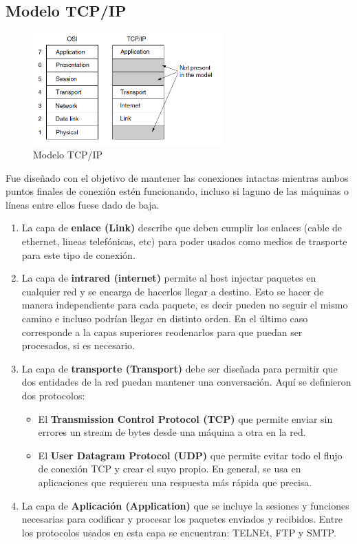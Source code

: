 \documentclass[10pt,a4paper]{article}
\begin{document}
\subsection{Modelo TCP/IP}
\begin{figure}[H]
	\centering
	\includegraphics[width=0.65\textwidth
]{images/tcpip.png}
	\caption[Modelo TCP/IP de Referencia]{Modelo TCP/IP}
	\label{fig:tcp}
\end{figure}
Fue diseñado con el objetivo de mantener las conexiones intactas mientras ambos puntos finales de conexión estén funcionando, incluso si laguno de las máquinas o líneas entre ellos fuese dado de baja.

\begin{enumerate}
  \item La capa de \textbf{enlace (Link)} describe que deben cumplir los enlaces (cable de ethernet, lineas telefónicas, etc) para poder usados como medios de trasporte para este tipo de conexión.
  \item La capa de \textbf{intrared (internet)} permite al host injectar paquetes en cualquier red y se encarga de hacerlos llegar a destino. Esto se hacer de manera independiente para cada paquete, es decir pueden no seguir el mismo camino e incluso podrían llegar en distinto orden. En el último caso corresponde a la capas superiores reodenarlos para que puedan ser procesados, si es necesario.
  \item La capa de \textbf{transporte (Transport)} debe ser diseñada para permitir que dos entidades de la red puedan mantener una conversación. Aquí se definieron dos protocolos:
  \begin{itemize}
    \item El \textbf{Transmission Control Protocol (TCP)} que permite enviar sin errores un stream de bytes desde una máquina a otra en la red.
    \item El \textbf{User Datagram Protocol (UDP)} que permite evitar todo el flujo de conexión TCP y crear el suyo propio. En general, se usa en aplicaciones que requieren una respuesta más rápida que precisa. 
  \end{itemize}
  \item La capa de \textbf{Aplicación (Application)} que se incluye la sesiones y funciones necesarias para codificar y procesar los paquetes enviados y recibidos. Entre los protocolos usados en esta capa se encuentran: TELNEt, FTP y SMTP.
\end{enumerate}
\end{document}

